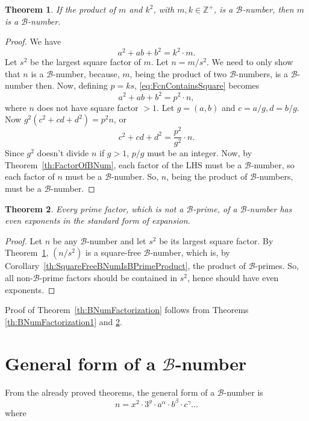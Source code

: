 \documentclass[reqno]{amsart}
\newtheorem{theorem}{Theorem}
\newcommand{\bnum}   {\ensuremath{\mathcal B}-number}
\newcommand{\bprime} {\ensuremath{\mathcal B}-prime}
\newcommand{\bq}[2]{\ensuremath{{#1}^2 + {#1}{#2} + {#2}^2}}
\newcommand{\bqcd}{\bq{c}{d}}
\newcommand{\Positive}{\ensuremath{\mathbb{Z^+}}}
\begin{document}
\begin{theorem}
  If the product of $m$ and $k^2$, with $m,k \in \Positive$, is a \bnum, then $m$ is a \bnum.
  \label{th:BNumDividedBySquare}
\end{theorem}
\begin{proof}
  We have 
  \begin{equation}
    \label{eq:FcnContainsSquare}
    \bq{a}{b} = k^2 \cdot m.
  \end{equation}
  Let $s^2$ be the largest square factor of $m$.  Let
  $n=m/s^2$. We need to only show that $n$ is a \bnum{},
  because, $m$, being the product of two \bnum{}s, is a \bnum{}
  then.  Now, defining $p=ks$, \eqref{eq:FcnContainsSquare}
  becomes
  \begin{equation*}
    \bq{a}{b} = p^2 \cdot n,
  \end{equation*}
  where $n$ does not have square factor $>1$.  Let $g=(a,b)$
  and $c=a/g, d=b/g$. Now $g^2(\bqcd) = p^2n$, or
  \begin{equation*}
    \bqcd = \frac{p^2}{g^2} \cdot n.
  \end{equation*}
  Since $g^2$ doesn't divide $n$ if $g>1$, $p/g$ must be an integer.
  Now, by Theorem~\ref{th:FactorOfBNum}, each factor of the LHS must
  be a \bnum{}, so each factor of $n$ must be a \bnum.  So,
  $n$, being the product of \bnum{}s, must be a \bnum{}. 
\end{proof}

\begin{theorem}
  \label{th:BNumFactorization2}
  Every prime factor, which is not a \bprime,  of a \bnum{}  has 
  even exponents in the standard form of expansion.
\end{theorem}
\begin{proof}
  Let $n$ be any \bnum{} and let $s^2$ be its largest square
  factor.  By Theorem~\ref{th:BNumDividedBySquare},
  $(n/s^2)$ is a square-free \bnum{}, which is, by
  Corollary~\ref{th:SquareFreeBNumIsBPrimeProduct}, the
  product of \bprime{}s.  So, all non-\bprime{} factors
  should be contained in $s^2$, hence 
  should have even exponents.
\end{proof}

Proof of Theorem~\ref{th:BNumFactorization} follows from Theorems
\ref{th:BNumFactorization1} and \ref{th:BNumFactorization2}.

\section{General form of a \bnum}
From the already proved theorems, the general form of a
\bnum{} is
\begin{equation}
  \label{eq:BNumGenForm}
  n = x^2 \cdot 3^y \cdot a^\alpha{}\cdot{}b^\beta{}\cdot{}c^\gamma\ldots
\end{equation}
where
\end{document}
